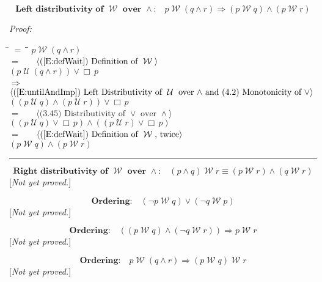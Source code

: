 \documentclass[fleqn, leqno]{article}
\newcommand{\lgap}{2pt}                             %
\newcommand{\mymathindent}{24pt}                    %
\newcommand{\impl}{\ensuremath{\Rightarrow}}        %
\newcommand{\Until}{\;\mathcal{U}\;}
\newcommand{\Wait}{\;\mathcal{W}\;}
\newcommand{\Always}{\Box\,}
\newcommand{\myqed}{\rule[-.23ex]{1.2ex}{2.0ex}}
\newcommand{\myqedtab}{\hspace{388.5pt}}              %
\newcommand{\Gll} {\langle}                         %
\newcommand{\Ggg} {\rangle}                         %
\newcommand{\Hint}[1]     {\ \ \ $\Gll              \mbox{#1} \Ggg$ }   %
\begin{document}
\begin{equation}\label{E:leftWaitAndDist}
\textbf{Left distributivity of $\Wait$ over $\land$:}\quad p \Wait (q \land r) \impl (p \Wait q) \land (p \Wait r)
\end{equation}

\emph{Proof:}
\begin{tabbing}
\hspace{\mymathindent} \= $= \;$ \= \myqedtab \= \kill
\> \> $p \Wait (q \land r)$\\[\lgap]
\> $=$ \> \Hint{(\ref{E:defWait}) Definition of $\Wait$} \\[\lgap]
\> \> $(p \Until (q \land r)) \lor \Always p$\\[\lgap]
\> $\impl$ \> \Hint{(\ref{E:untilAndImp}) Left Distributivity of $\Until$ over $\land$ and (4.2) Monotonicity of $\lor$} \\[\lgap]
\> \> $((p \Until q) \land (p \Until r)) \lor \Always p$\\[\lgap]
\> $=$ \> \Hint{(3.45) Distributivity of $\lor$ over $\land$} \\[\lgap]
\> \> $((p \Until q) \lor \Always p) \land ((p \Until r) \lor \Always p)$\\[\lgap]
\> $=$ \> \Hint{(\ref{E:defWait}) Definition of $\Wait$, twice} \\[\lgap]
\> \> $(p \Wait q) \land (p \Wait r)$ \> \myqed
\end{tabbing}

\begin{equation}\label{E:rightWaitAndDist}
\textbf{Right distributivity of $\Wait$ over $\land$:}\quad (p \land q) \Wait r \equiv (p \Wait r) \land (q \Wait r)
\end{equation}
[\textit{Not yet proved.}]

\begin{equation}\label{E:waitOrdering}
\textbf{Ordering:}\quad (\neg p \Wait q) \lor (\neg q \Wait p)
\end{equation}
[\textit{Not yet proved.}]

\begin{equation}\label{E:waitOrderingTwo}
\textbf{Ordering:}\quad ((p \Wait q) \land (\neg q \Wait r)) \impl p \Wait r
\end{equation}
[\textit{Not yet proved.}]

\begin{equation}\label{E:waitOrderingThree}
\textbf{Ordering:}\quad p \Wait (q \land r) \impl (p \Wait q) \Wait r
\end{equation}
[\textit{Not yet proved.}]
\end{document}
